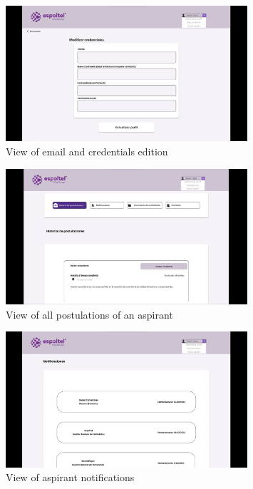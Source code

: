 \documentclass{scrreprt}
\begin{document}
\begin{figure}[H]
	\centering \small
	\includegraphics[width=0.8\textwidth]{WebPrototype/wflow-51.jpeg}
	\caption{View of email and credentials edition}
\end{figure}

\begin{figure}[H]
	\centering \small
	\includegraphics[width=0.8\textwidth]{WebPrototype/wflow-52.jpeg}
	\caption{View of all postulations of an aspirant}
\end{figure}

\begin{figure}[H]
	\centering \small
	\includegraphics[width=0.8\textwidth]{WebPrototype/wflow-53.jpeg}
	\caption{View of aspirant notifications}
\end{figure}
\end{document}
